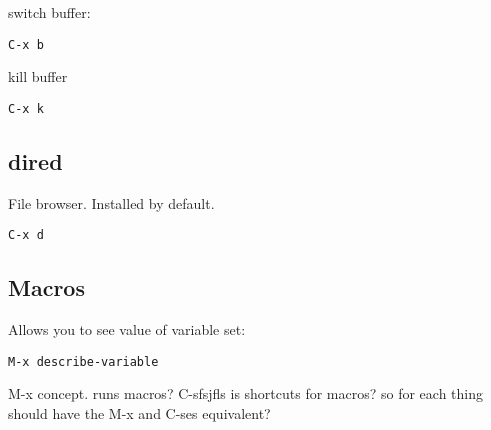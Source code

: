 switch buffer:
\begin{verbatim}
C-x b
\end{verbatim}

kill buffer
\begin{verbatim}
C-x k
\end{verbatim}



\subsection{dired}
File browser. Installed by default.

\begin{verbatim}
C-x d
\end{verbatim}




\subsection{Macros}
Allows you to see value of variable set:

\begin{verbatim}
M-x describe-variable
\end{verbatim}


M-x concept. runs macros?
C-sfsjfls is shortcuts for macros? so for each thing should have the M-x and C-ses equivalent?
